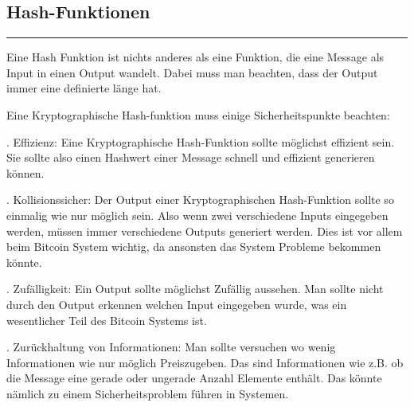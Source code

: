 \vspace*{1mm}
\subsection*{Hash-Funktionen}
\vspace{-10mm}
\noindent\rule{0.8\textwidth}{0.4pt}

\vspace{5mm}

\noindent
Eine Hash Funktion ist nichts anderes als eine Funktion, die eine Message als Input in einen Output wandelt. Dabei muss man beachten, dass der Output immer eine definierte länge hat.

\noindent
Eine Kryptographische Hash-funktion muss einige Sicherheitspunkte beachten:

. Effizienz:
Eine Kryptographische Hash-Funktion sollte möglichst effizient sein. Sie sollte also einen Hashwert einer Message schnell und effizient generieren können.

. Kollisionssicher:
Der Output einer Kryptographischen Hash-Funktion sollte so einmalig wie nur möglich sein. Also wenn zwei verschiedene Inputs eingegeben werden, müssen immer verschiedene Outputs generiert werden.
Dies ist vor allem beim Bitcoin System wichtig, da ansonsten das System Probleme bekommen könnte.

. Zufälligkeit:
Ein Output sollte möglichst Zufällig aussehen. Man sollte nicht durch den Output erkennen welchen Input eingegeben wurde, was ein wesentlicher Teil des Bitcoin Systems ist.

. Zurückhaltung von Informationen:
Man sollte versuchen wo wenig Informationen wie nur möglich Preiszugeben. Das sind Informationen wie z.B. ob die Message eine gerade oder ungerade Anzahl Elemente enthält.
Das könnte nämlich zu einem Sicherheitsproblem führen in Systemen.



\newpage
